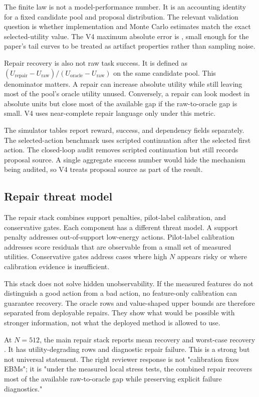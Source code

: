The finite law is not a model-performance number. It is an accounting identity
for a fixed candidate pool and proposal distribution. The relevant validation
question is whether implementation and Monte Carlo estimates match the exact
selected-utility value. The V4 maximum absolute error is
\VFourEBMExactMaxError{}, small enough for the paper's tail curves to be
treated as artifact properties rather than sampling noise.

Repair recovery is also not raw task success. It is defined as
\((U_{\mathrm{repair}}-U_{\mathrm{raw}})/(U_{\mathrm{oracle}}-U_{\mathrm{raw}})\)
on the same candidate pool. This denominator matters. A repair can increase
absolute utility while still leaving most of the pool's oracle utility unused.
Conversely, a repair can look modest in absolute units but close most of the
available gap if the raw-to-oracle gap is small. V4 uses near-complete repair
language only under this metric.

The simulator tables report reward, success, and dependency fields separately.
The selected-action benchmark uses scripted continuation after the selected
first action. The closed-loop audit removes scripted continuation but still
records proposal source. A single aggregate success number would hide the
mechanism being audited, so V4 treats proposal source as part of the result.

\subsection{Repair threat model}
\label{app:V4-repair-threat-model}

The repair stack combines support penalties, pilot-label calibration, and
conservative gates. Each component has a different threat model. A support
penalty addresses out-of-support low-energy actions. Pilot-label calibration
addresses score residuals that are observable from a small set of measured
utilities. Conservative gates address cases where high \(N\) appears risky or
where calibration evidence is insufficient.

This stack does not solve hidden unobservability. If the measured features do
not distinguish a good action from a bad action, no feature-only calibration
can guarantee recovery. The oracle rows and value-shaped upper bounds are
therefore separated from deployable repairs. They show what would be possible
with stronger information, not what the deployed method is allowed to use.

At \(N=512\), the main repair stack reports mean recovery
\VFourEBMRepairMeanRecovery{} and worst-case recovery
\VFourEBMRepairWorstRecovery{}. It has \VFourEBMRepairDegrades{}
utility-degrading rows and \VFourEBMRepairFailures{} diagnostic repair
failure. This is a strong but not universal statement. The right reviewer
response is not "calibration fixes EBMs"; it is "under the measured local
stress tests, the combined repair recovers most of the available raw-to-oracle
gap while preserving explicit failure diagnostics."

